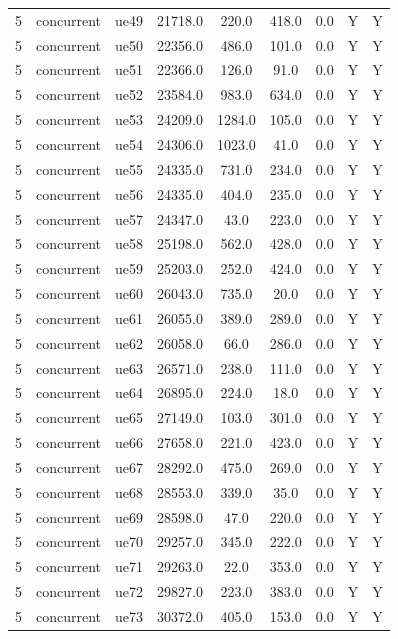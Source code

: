 \begin{table}[ht]
\begin{tabular}{|c|c|c|c|c|c|c|c|c|}
5 & concurrent & ue49 & 21718.0 & 220.0 & 418.0 & 0.0 & Y & Y \\
5 & concurrent & ue50 & 22356.0 & 486.0 & 101.0 & 0.0 & Y & Y \\
5 & concurrent & ue51 & 22366.0 & 126.0 & 91.0 & 0.0 & Y & Y \\
5 & concurrent & ue52 & 23584.0 & 983.0 & 634.0 & 0.0 & Y & Y \\
5 & concurrent & ue53 & 24209.0 & 1284.0 & 105.0 & 0.0 & Y & Y \\
5 & concurrent & ue54 & 24306.0 & 1023.0 & 41.0 & 0.0 & Y & Y \\
5 & concurrent & ue55 & 24335.0 & 731.0 & 234.0 & 0.0 & Y & Y \\
5 & concurrent & ue56 & 24335.0 & 404.0 & 235.0 & 0.0 & Y & Y \\
5 & concurrent & ue57 & 24347.0 & 43.0 & 223.0 & 0.0 & Y & Y \\
5 & concurrent & ue58 & 25198.0 & 562.0 & 428.0 & 0.0 & Y & Y \\
5 & concurrent & ue59 & 25203.0 & 252.0 & 424.0 & 0.0 & Y & Y \\
5 & concurrent & ue60 & 26043.0 & 735.0 & 20.0 & 0.0 & Y & Y \\
5 & concurrent & ue61 & 26055.0 & 389.0 & 289.0 & 0.0 & Y & Y \\
5 & concurrent & ue62 & 26058.0 & 66.0 & 286.0 & 0.0 & Y & Y \\
5 & concurrent & ue63 & 26571.0 & 238.0 & 111.0 & 0.0 & Y & Y \\
5 & concurrent & ue64 & 26895.0 & 224.0 & 18.0 & 0.0 & Y & Y \\
5 & concurrent & ue65 & 27149.0 & 103.0 & 301.0 & 0.0 & Y & Y \\
5 & concurrent & ue66 & 27658.0 & 221.0 & 423.0 & 0.0 & Y & Y \\
5 & concurrent & ue67 & 28292.0 & 475.0 & 269.0 & 0.0 & Y & Y \\
5 & concurrent & ue68 & 28553.0 & 339.0 & 35.0 & 0.0 & Y & Y \\
5 & concurrent & ue69 & 28598.0 & 47.0 & 220.0 & 0.0 & Y & Y \\
5 & concurrent & ue70 & 29257.0 & 345.0 & 222.0 & 0.0 & Y & Y \\
5 & concurrent & ue71 & 29263.0 & 22.0 & 353.0 & 0.0 & Y & Y \\
5 & concurrent & ue72 & 29827.0 & 223.0 & 383.0 & 0.0 & Y & Y \\
5 & concurrent & ue73 & 30372.0 & 405.0 & 153.0 & 0.0 & Y & Y \\

\end{tabular}
\end{table}
